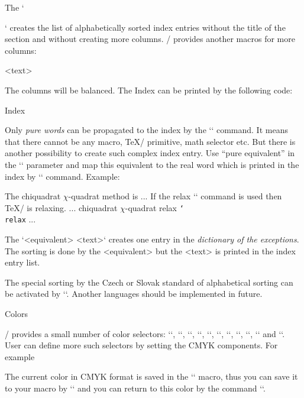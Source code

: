 The `\makeindex` creates the list of alphabetically sorted index entries
without the title of the section and without creating more columns. \OpTeX/
provides another macros for more columns: 

\begtt
{}
<text>
\endmulti
\endtt

The columns will be balanced. The Index can be printed by the following
code:

\begtt
\sec Index\par
{} \makeindex \endmulti
\endtt

Only {\em pure words} can be propagated to the index by the `\ii` command. It
means that there cannot be any macro, \TeX/ primitive, math selector etc.
But there is another possibility to create such complex index entry. Use
``pure equivalent'' in the `\ii` parameter and map this equivalent to the
real word which is printed in the index by `\iis` command. Example:

\begtt
The \ii chiquadrat $\chi$-quadrat method is 
...
If the \ii relax `\relax` command is used then \TeX/ is relaxing.
...
\iis chiquadrat {$\chi$-quadrat}
\iis relax {{\tt \char`\\relax}}
...
\endtt

The `\iis <equivalent> {<text>}` creates one entry in the {\em dictionary 
of the exceptions}. The sorting is done by the <equivalent> but the
<text> is printed in the index entry list.

The special sorting by the Czech or Slovak standard of alphabetical sorting
can be activated by `\cssort`. Another languages should be implemented in
future.


\sec Colors

\OpTeX/ provides a small number of color selectors: 
{\localcolor\Blue `\Blue`}, 
{\localcolor\Red `\Red`}, 
{\localcolor\Brown `\Brown`},
{\localcolor\Green `\Green`}, 
{\localcolor\Yellow `\Yellow`}, 
{\localcolor\Cyan `\Cyan`}, 
{\localcolor\Magenta `\Magenta`}, 
{`\White`}, 
{\localcolor\Grey `\Grey`}, 
{\localcolor\LightGrey `\LightGrey`} and
`\Black`. User can define more
such selectors by setting the CMYK components. For example

\begtt
\def\Orange{\setcmykcolor{0 0.5 1 0}}
\endtt

The current color in CMYK format is saved in the `\currentcolor` macro, thus you
can save it to your macro  by `\let\yourmacro=\currentcolor` and you can return to
this color by the command `\setcmykcolor\yourmacro`.

